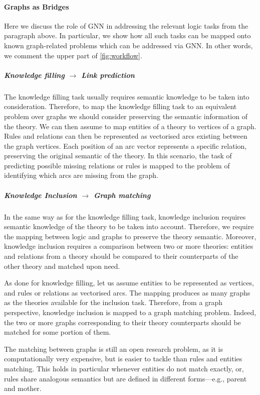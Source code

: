 \documentclass[12pt,a4paper,openright,twoside]{book}
\begin{document}
\paragraph{Graphs as Bridges}

Here we discuss the role of GNN in addressing the relevant logic tasks from the paragraph above.
%
In particular, we show how all such tasks can be mapped onto known graph-related problems which can be addressed via GNN.
%
In other words, we comment the upper part of \cref{fig:workflow}.

\subparagraph{Knowledge filling $\rightarrow$ Link prediction}
%
The knowledge filling task usually requires semantic knowledge to be taken into consideration.
%
Therefore, to map the knowledge filling task to an equivalent problem over graphs we should consider preserving the semantic information of the theory.
%
We can then assume to map entities of a theory to vertices of a graph.
%
Rules and relations can then be represented as vectorised arcs existing between the graph vertices.
%
Each position of an arc vector represents a specific relation, preserving the original semantic of the theory.
%
In this scenario, the task of predicting possible missing relations or rules is mapped to the problem of identifying which arcs are missing from the graph.

\subparagraph{Knowledge Inclusion $\rightarrow$ Graph matching}

In the same way as for the knowledge filling task, knowledge inclusion requires semantic knowledge of the theory to be taken into account.
%
Therefore, we require the mapping between logic and graphs to preserve the theory semantic.
%
Moreover, knowledge inclusion requires a comparison between two or more theories: entities and relations from a theory should be compared to their counterparts of the other theory and matched upon need.

As done for knowledge filling, let us assume entities to be represented as vertices, and rules or relations as vectorised arcs.
%
The mapping produces as many graphs as the theories available for the inclusion task.
%
Therefore, from a graph perspective, knowledge inclusion is mapped to a graph matching problem.
%
Indeed, the two or more graphs corresponding to their theory counterparts should be matched for some portion of them.

The matching between graphs is still an open research problem, as it is computationally very expensive, but is easier to tackle than rules and entities matching.
%
This holds in particular whenever entities do not match exactly, or, rules share analogous semantics but are defined in different forms---e.g., parent and mother.
\end{document}
